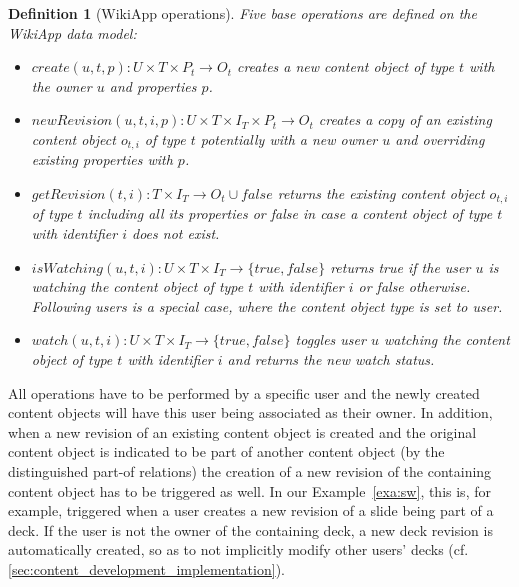 \documentclass[ngerman,UKenglish,table]{scrbook}
\newtheorem{definition}{Definition}
\begin{document}
\begin{definition}[WikiApp operations]
\label{def:operations}
Five base operations are defined on the WikiApp data model:
\begin{itemize}
	\item $create(u,t,p):U \times T \times P_t \rightarrow O_t$ creates a new content object of type $t$ with the owner $u$ and properties $p$.
	\item $newRevision(u,t,i,p):U \times T \times I_T \times P_t \rightarrow O_t$ creates a copy of an existing content object $o_{t,i}$ of type $t$ potentially with a new owner $u$ and overriding existing properties with $p$.
	\item $getRevision(t,i):T \times I_T \rightarrow O_t \cup {false}$ returns the existing content object $o_{t,i}$ of type $t$ including all its properties or false in case a content object of type $t$ with identifier $i$ does not exist.
	\item $isWatching(u,t,i):U \times T \times I_T \rightarrow \{true,false\}$ returns true if the user $u$ is watching the content object of type $t$ with identifier $i$ or false otherwise.
	Following users is a special case, where the content object type is set to user.
	\item $watch(u,t,i):U \times T \times I_T \rightarrow \{true,false\}$ toggles user $u$ watching the content object of type $t$ with identifier $i$ and returns the new watch status.
\end{itemize}
\end{definition}

All operations have to be performed by a specific user and the newly created content objects will have this user being associated as their owner.
In addition, when a new revision of an existing content object is created and the original content object is indicated to be part of another content object (by the distinguished part-of relations) the creation of a new revision of the containing content object has to be triggered as well.
In our Example~\autoref{exa:sw}, this is, for example, triggered when a user creates a new revision of a slide being part of a deck.
If the user is not the owner of the containing deck, a new deck revision is automatically created, so as to not implicitly modify other users' decks (cf. \autoref{sec:content_development_implementation}).

%
\end{document}
